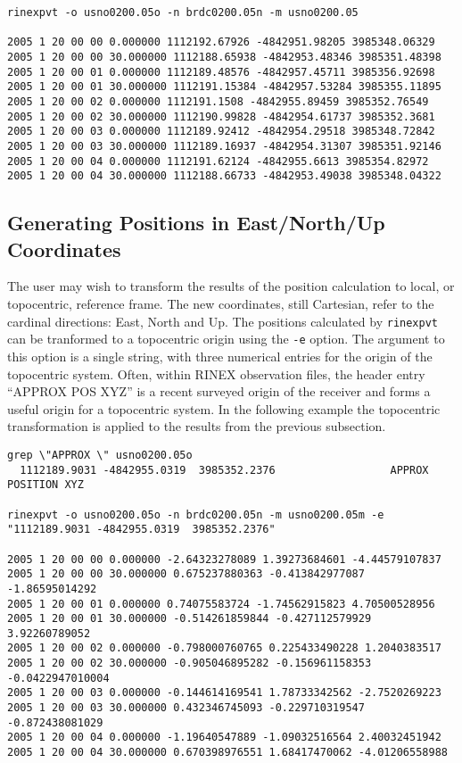 \small
\begin{singlespace}
\begin{verbatim}
rinexpvt -o usno0200.05o -n brdc0200.05n -m usno0200.05

2005 1 20 00 00 0.000000 1112192.67926 -4842951.98205 3985348.06329
2005 1 20 00 00 30.000000 1112188.65938 -4842953.48346 3985351.48398
2005 1 20 00 01 0.000000 1112189.48576 -4842957.45711 3985356.92698
2005 1 20 00 01 30.000000 1112191.15384 -4842957.53284 3985355.11895
2005 1 20 00 02 0.000000 1112191.1508 -4842955.89459 3985352.76549
2005 1 20 00 02 30.000000 1112190.99828 -4842954.61737 3985352.3681
2005 1 20 00 03 0.000000 1112189.92412 -4842954.29518 3985348.72842
2005 1 20 00 03 30.000000 1112189.16937 -4842954.31307 3985351.92146
2005 1 20 00 04 0.000000 1112191.62124 -4842955.6613 3985354.82972
2005 1 20 00 04 30.000000 1112188.66733 -4842953.49038 3985348.04322
\end{verbatim}
\end{singlespace}
\normalsize

\subsection{Generating Positions in East/North/Up Coordinates}

The user may wish to transform the results of the position calculation to
local, or topocentric, reference frame. The new coordinates, still Cartesian,
refer to the cardinal directions: East, North and Up. The positions calculated
by \texttt{rinexpvt} can be tranformed to a topocentric origin using the
\texttt{-e} option. The argument to this option is a single string, with three
numerical entries for the origin of the topocentric system. Often, within
RINEX observation files, the header entry ``APPROX POS XYZ'' is a recent
surveyed origin of the receiver and forms a useful origin for a topocentric
system. In the following example the topocentric transformation is applied to
the results from the previous subsection.

\small
\begin{singlespace}
\begin{verbatim}
grep \"APPROX \" usno0200.05o
  1112189.9031 -4842955.0319  3985352.2376                  APPROX POSITION XYZ

rinexpvt -o usno0200.05o -n brdc0200.05n -m usno0200.05m -e "1112189.9031 -4842955.0319  3985352.2376" 

2005 1 20 00 00 0.000000 -2.64323278089 1.39273684601 -4.44579107837
2005 1 20 00 00 30.000000 0.675237880363 -0.413842977087 -1.86595014292
2005 1 20 00 01 0.000000 0.74075583724 -1.74562915823 4.70500528956
2005 1 20 00 01 30.000000 -0.514261859844 -0.427112579929 3.92260789052
2005 1 20 00 02 0.000000 -0.798000760765 0.225433490228 1.2040383517
2005 1 20 00 02 30.000000 -0.905046895282 -0.156961158353 -0.0422947010004
2005 1 20 00 03 0.000000 -0.144614169541 1.78733342562 -2.7520269223
2005 1 20 00 03 30.000000 0.432346745093 -0.229710319547 -0.872438081029
2005 1 20 00 04 0.000000 -1.19640547889 -1.09032516564 2.40032451942
2005 1 20 00 04 30.000000 0.670398976551 1.68417470062 -4.01206558988
\end{verbatim}
\end{singlespace}
\normalsize


